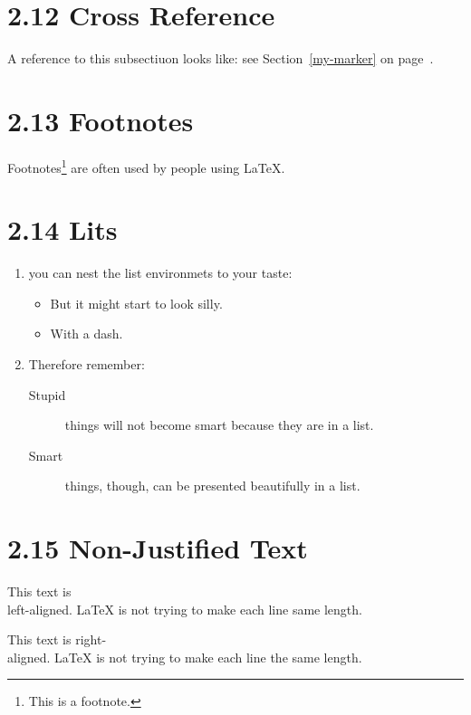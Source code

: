 \documentclass{article}
\begin{document}
\section{2.12 Cross Reference}

A reference to this subsectiuon%
\label{my-marker} looks like:
see Section~\ref{my-marker}
on page~\pageref{my-marker}.

\section{2.13 Footnotes}

Footnotes\footnote{This is a footnote.} are 
often used by people using \LaTeX.

\section{2.14 Lits}

\begin{enumerate}
  \item you can nest the list environmets to your taste:
  \begin{itemize}
    \item But it might start to look silly.
    \item [-] With a dash.
  \end{itemize}
  \item Therefore remember:
  \begin{description}
    \item[Stupid] things will not become smart because they are in a list.
    \item[Smart] things, though, can be presented beautifully in a list.  
  \end{description}
\end{enumerate}

\section{2.15 Non-Justified Text}

\begin{flushleft}
  This text is\\ left-aligned.
  \LaTeX{} is not trying to make each line same length.
\end{flushleft}

\begin{flushright}
  This text is right-\\aligned.
  \LaTeX{} is not trying to make each line the same length.
\end{flushright}
\end{document}
